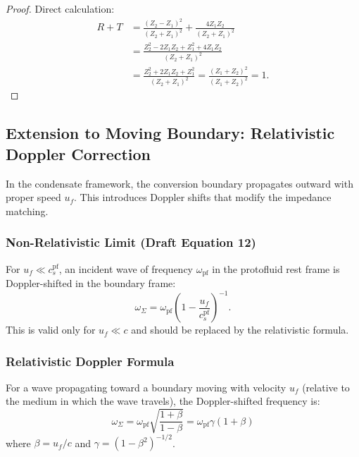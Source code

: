 \begin{proof}
Direct calculation:
\begin{align}
R + T &= \frac{(Z_2 - Z_1)^2}{(Z_2 + Z_1)^2} + \frac{4 Z_1 Z_2}{(Z_2 + Z_1)^2} \\
&= \frac{Z_2^2 - 2 Z_1 Z_2 + Z_1^2 + 4 Z_1 Z_2}{(Z_2 + Z_1)^2} \\
&= \frac{Z_2^2 + 2 Z_1 Z_2 + Z_1^2}{(Z_2 + Z_1)^2} = \frac{(Z_1 + Z_2)^2}{(Z_1 + Z_2)^2} = 1.
\end{align}
\end{proof}

\subsection{Extension to Moving Boundary: Relativistic Doppler Correction}
\label{app:moving_boundary}

In the condensate framework, the conversion boundary propagates outward with proper speed $u_f$. This introduces Doppler shifts that modify the impedance matching.

\subsubsection{Non-Relativistic Limit (Draft Equation 12)}

For $u_f \ll c_{s}^{\text{pf}}$, an incident wave of frequency $\omega_{\text{pf}}$ in the protofluid rest frame is Doppler-shifted in the boundary frame:
\begin{equation}
\label{eq:nonrel_doppler}
\omega_\Sigma = \omega_{\text{pf}} \left( 1 - \frac{u_f}{c_s^{\text{pf}}} \right)^{-1}.
\end{equation}
This is valid only for $u_f \ll c$ and should be replaced by the relativistic formula.

\subsubsection{Relativistic Doppler Formula}

\begin{proposition}
\label{prop:rel_doppler}
For a wave propagating toward a boundary moving with velocity $u_f$ (relative to the medium in which the wave travels), the Doppler-shifted frequency is:
\begin{equation}
\label{eq:rel_doppler}
\boxed{\omega_\Sigma = \omega_{\text{pf}} \sqrt{\frac{1 + \beta}{1 - \beta}} = \omega_{\text{pf}} \gamma (1 + \beta)}
\end{equation}
where $\beta = u_f / c$ and $\gamma = (1 - \beta^2)^{-1/2}$.
\end{proposition}

